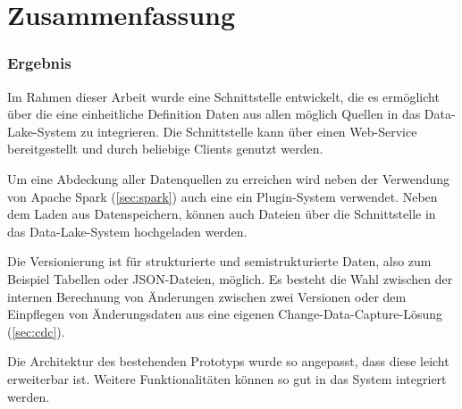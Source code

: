 \chapter{Zusammenfassung}

\subsection{Ergebnis}
Im Rahmen dieser Arbeit wurde eine Schnittstelle entwickelt, die es ermöglicht über die eine einheitliche Definition Daten aus allen möglich Quellen in das Data-Lake-System zu integrieren.
Die Schnittstelle kann über einen Web-Service bereitgestellt und durch beliebige Clients genutzt werden.

Um eine Abdeckung aller Datenquellen zu erreichen wird neben der Verwendung von Apache Spark (\cref{sec:spark}) auch eine ein Plugin-System verwendet.
Neben dem Laden aus Datenspeichern, können auch Dateien über die Schnittstelle in das Data-Lake-System hochgeladen werden.

Die Versionierung ist für strukturierte und semistrukturierte Daten, also zum Beispiel Tabellen oder JSON-Dateien, möglich.
Es besteht die Wahl zwischen der internen Berechnung von Änderungen zwischen zwei Versionen oder dem Einpflegen von Änderungsdaten aus eine eigenen Change-Data-Capture-Lösung (\cref{sec:cdc}).

Die Architektur des bestehenden Prototyps wurde so angepasst, dass diese leicht erweiterbar ist.
Weitere Funktionalitäten können so gut in das System integriert werden.
